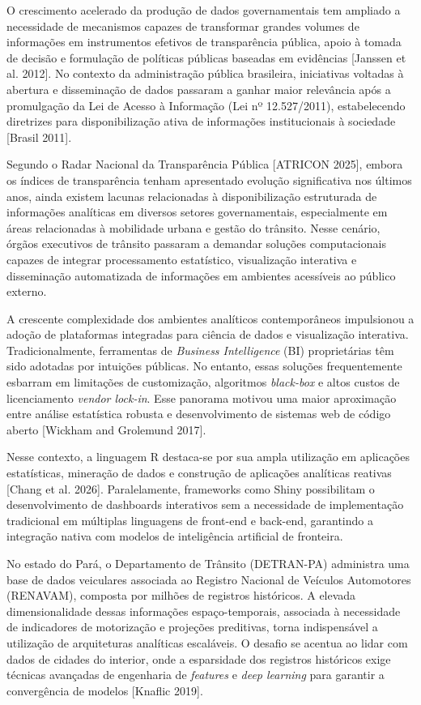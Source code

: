 \documentclass[12pt]{article}
\begin{document}
O crescimento acelerado da produção de dados governamentais tem ampliado a necessidade de mecanismos capazes de transformar grandes volumes de informações em instrumentos efetivos de transparência pública, apoio à tomada de decisão e formulação de políticas públicas baseadas em evidências [Janssen et al. 2012]. No contexto da administração pública brasileira, iniciativas voltadas à abertura e disseminação de dados passaram a ganhar maior relevância após a promulgação da Lei de Acesso à Informação (Lei nº 12.527/2011), estabelecendo diretrizes para disponibilização ativa de informações institucionais à sociedade [Brasil 2011].

Segundo o Radar Nacional da Transparência Pública [ATRICON 2025], embora os índices de transparência tenham apresentado evolução significativa nos últimos anos, ainda existem lacunas relacionadas à disponibilização estruturada de informações analíticas em diversos setores governamentais, especialmente em áreas relacionadas à mobilidade urbana e gestão do trânsito. Nesse cenário, órgãos executivos de trânsito passaram a demandar soluções computacionais capazes de integrar processamento estatístico, visualização interativa e disseminação automatizada de informações em ambientes acessíveis ao público externo.

A crescente complexidade dos ambientes analíticos contemporâneos impulsionou a adoção de plataformas integradas para ciência de dados e visualização interativa. Tradicionalmente, ferramentas de \textit{Business Intelligence }(BI) proprietárias têm sido adotadas por intuições públicas. No entanto, essas soluções frequentemente esbarram em limitações de customização, algoritmos \textit{black-box} e altos custos de licenciamento \textit{vendor lock-in}. Esse panorama motivou uma maior aproximação entre análise estatística robusta e desenvolvimento de sistemas web de código aberto [Wickham and Grolemund 2017]. 

Nesse contexto, a linguagem R destaca-se por sua ampla utilização em aplicações estatísticas, mineração de dados e construção de aplicações analíticas reativas [Chang et al. 2026]. Paralelamente, frameworks como Shiny possibilitam o desenvolvimento de dashboards interativos sem a necessidade de implementação tradicional em múltiplas linguagens de front-end e back-end, garantindo a integração nativa com modelos de inteligência artificial de fronteira.

No estado do Pará, o Departamento de Trânsito (DETRAN-PA) administra uma base de dados veiculares associada ao Registro Nacional de Veículos Automotores (RENAVAM), composta por milhões de registros históricos. A elevada dimensionalidade dessas informações espaço-temporais, associada à necessidade de indicadores de motorização e projeções preditivas, torna indispensável a utilização de arquiteturas analíticas escaláveis. O desafio se acentua ao lidar com dados de cidades do interior, onde a esparsidade dos registros históricos exige técnicas avançadas de engenharia de \textit{features} e \textit{deep learning }para garantir a convergência de modelos [Knaflic 2019].
\end{document}

